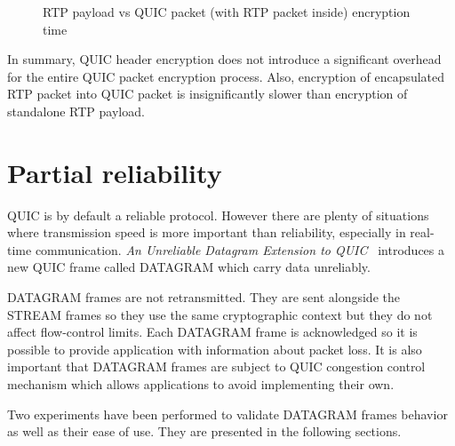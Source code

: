 \begin{figure}[!h]
    \centering
    \caption{RTP payload vs QUIC packet (with RTP packet inside) encryption time}
    \label{fig:rtp-payload-quic-packet-enc}
\end{figure}

In summary, QUIC header encryption does not introduce a significant overhead for the entire QUIC packet encryption process.
Also, encryption of encapsulated RTP packet into QUIC packet is insignificantly slower than encryption of standalone RTP payload.

\clearpage

\section{Partial reliability}
\label{sec:partial-reliability}
QUIC is by default a reliable protocol.
However there are plenty of situations where transmission speed is more important than reliability, especially in real-time communication.
\textit{An Unreliable Datagram Extension to QUIC}~\cite{ietf-quic-datagram-02} introduces a new QUIC frame called DATAGRAM which carry data unreliably.

DATAGRAM frames are not retransmitted.
They are sent alongside the STREAM frames so they use the same cryptographic context but they do not affect flow-control limits.
Each DATAGRAM frame is acknowledged so it is possible to provide application with information about packet loss.
It is also important that DATAGRAM frames are subject to QUIC congestion control mechanism which allows applications to avoid implementing their own.

Two experiments have been performed to validate DATAGRAM frames behavior as well as their ease of use.
They are presented in the following sections.

